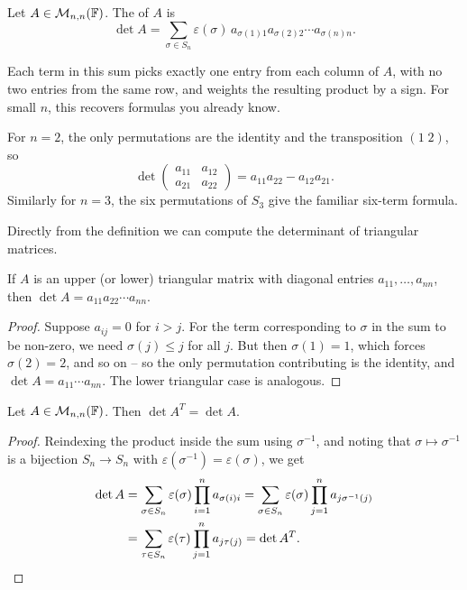 \documentclass[a4paper]{scrartcl}
\begin{document}
\begin{definition}[Determinant]
    Let $A \in \mathcal{M}_{n,n}(\mathbb{F})$. The  of $A$ is
    $$
    \det A = \sum_{\sigma \in S_n} \varepsilon(\sigma)\, a_{\sigma(1) 1} a_{\sigma(2) 2} \cdots a_{\sigma(n) n}.
    $$
\end{definition}

Each term in this sum picks exactly one entry from each column of $A$, with no two entries from the same row, and weights the resulting product by a sign. For small $n$, this recovers formulas you already know.

\begin{example}
    For $n = 2$, the only permutations are the identity and the transposition $(1\;2)$, so
    $$
    \det \begin{pmatrix}
        a_{11} & a_{12} \\ a_{21} & a_{22}
    \end{pmatrix} = a_{11}a_{22} - a_{12}a_{21}.
    $$
    Similarly for $n = 3$, the six permutations of $S_3$ give the familiar six-term formula.
\end{example}

Directly from the definition we can compute the determinant of triangular matrices.

\begin{lemma}
    If $A$ is an upper (or lower) triangular matrix with diagonal entries $a_{11}, \dots, a_{nn}$, then $\det A = a_{11} a_{22} \cdots a_{nn}$.
\end{lemma}
\begin{proof}
    Suppose $a_{ij} = 0$ for $i > j$. For the term corresponding to $\sigma$ in the sum to be non-zero, we need $\sigma(j) \leq j$ for all $j$. But then $\sigma(1) = 1$, which forces $\sigma(2) = 2$, and so on -- so the only permutation contributing is the identity, and $\det A = a_{11} \cdots a_{nn}$. The lower triangular case is analogous.
\end{proof}

\begin{lemma}
    Let $A \in \mathcal{M}_{n,n}(\mathbb{F})$. Then $\det A^T = \det A$.
\end{lemma}
\begin{proof}
    Reindexing the product inside the sum using $\sigma^{-1}$, and noting that $\sigma \mapsto \sigma^{-1}$ is a bijection $S_n \rightarrow S_n$ with $\varepsilon(\sigma^{-1}) = \varepsilon(\sigma)$, we get
    \begin{align*}
    \det A &= \sum_{\sigma \in S_n} \varepsilon(\sigma) \prod_{i = 1}^n a_{\sigma(i) i} = \sum_{\sigma \in S_n} \varepsilon(\sigma) \prod_{j = 1}^n a_{j \sigma^{-1}(j)} \\
    &= \sum_{\tau \in S_n} \varepsilon(\tau) \prod_{j = 1}^n a_{j \tau(j)} = \det A^T. \qedhere
    \end{align*}
\end{proof}
\end{document}
